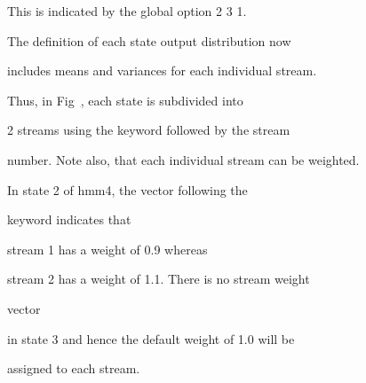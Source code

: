 This is indicated by the global option  2 3 1.


The definition of each state output distribution now


includes means and variances for each individual stream.





Thus, in Fig~\href{f:hmm4def}, each state is subdivided into


2 streams using the  keyword followed by the stream


number.  Note also, that each individual stream can be weighted.


In state 2 of \textsf{hmm4}, the vector following the


 keyword indicates that


stream 1 has a weight of 0.9 whereas


stream 2 has a weight of 1.1.  There is no stream weight


 vector


in state 3 and hence the default weight of 1.0 will be


assigned to each stream.





\vspace{1.0cm}








